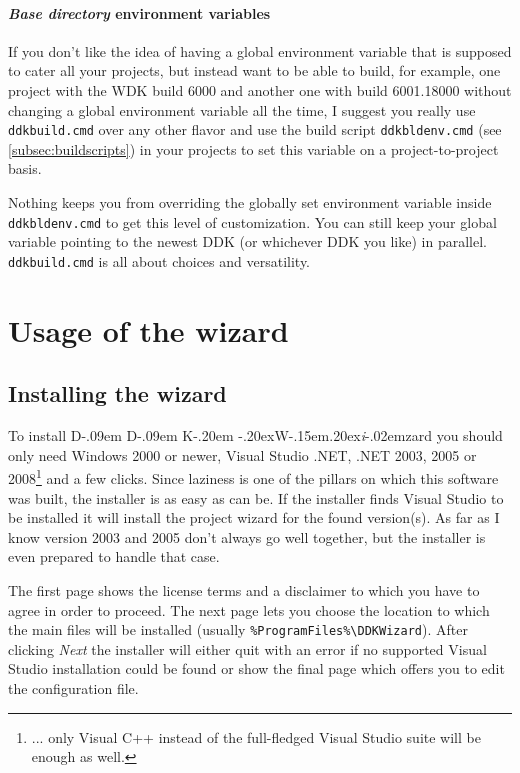 \documentclass[a4paper,titlepage]{report}
\def\ddkwiz{\texorpdfstring{D\kern-.09em D\kern-.09em K\kern-.20em \raise-.20ex\hbox{W}\kern-.15em\raise.20ex\hbox{\it{i}}\kern-.02em{zard}}{DDKWizard}}
\begin{document}
\subsubsection{\emph{Base directory} environment variables}
\label{subsubsec:basedir}
If you don't like the idea of having a global environment variable that is supposed to cater all your
projects, but instead want to be able to build, for example, one project with the WDK build 6000 and
another one with build 6001.18000 without changing a global environment variable all the time, I suggest
you really use \texttt{ddkbuild.cmd} over any other flavor and use the build script \texttt{ddkbldenv.cmd}
(see \autoref{subsec:buildscripts}) in your projects to set this variable on a project-to-project basis.

Nothing keeps you from overriding the globally set environment variable inside \texttt{ddkbldenv.cmd}
to get this level of customization. You can still keep your global variable pointing to the newest DDK (or
whichever DDK you like) in parallel. \texttt{ddkbuild.cmd} is all about choices and versatility.

\chapter{Usage of the wizard}\thispagestyle{fancy}
\section{Installing the wizard}
To install \ddkwiz{} you should only need Windows 2000 or newer, Visual Studio .NET,
.NET 2003, 2005 or 2008\footnote{... only
Visual C++ instead of the full-fledged Visual Studio suite will be enough as well.}
and a few clicks. Since laziness is one of the pillars on which this software was
built, the installer is as easy as can be.
If the installer finds Visual Studio to be installed it will install the
project wizard for the found version(s). As far as I know version 2003 and 2005
don't always go well together, but the installer is even prepared to handle that case.

The first page shows the license terms and a disclaimer to which you have to agree
in order to proceed. The next page lets you choose the location to which the
main files will be installed (usually \verb+%ProgramFiles%\DDKWizard+). After
clicking \emph{Next} the installer will either quit with an error if no supported
Visual Studio installation could be found or show the final page which offers
you to edit the configuration file.
\end{document}
